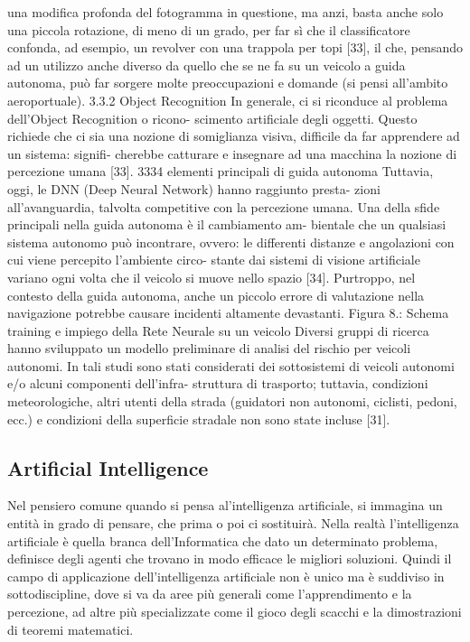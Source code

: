 \documentclass[14pt]{extarticle}
\begin{document}
\begin{itemize}
una modifica profonda del fotogramma in questione, ma anzi, basta
anche solo una piccola rotazione, di meno di un grado, per far sì che il
classificatore confonda, ad esempio, un revolver con una trappola per topi
[33], il che, pensando ad un utilizzo anche diverso da quello che se ne fa
su un veicolo a guida autonoma, può far sorgere molte preoccupazioni e
domande (si pensi all’ambito aeroportuale).
3.3.2
Object Recognition
In generale, ci si riconduce al problema dell’Object Recognition o ricono-
scimento artificiale degli oggetti. Questo richiede che ci sia una nozione
di somiglianza visiva, difficile da far apprendere ad un sistema: signifi-
cherebbe catturare e insegnare ad una macchina la nozione di percezione
umana [33].
3334
elementi principali di guida autonoma
Tuttavia, oggi, le DNN (Deep Neural Network) hanno raggiunto presta-
zioni all’avanguardia, talvolta competitive con la percezione umana.
Una della sfide principali nella guida autonoma è il cambiamento am-
bientale che un qualsiasi sistema autonomo può incontrare, ovvero: le
differenti distanze e angolazioni con cui viene percepito l’ambiente circo-
stante dai sistemi di visione artificiale variano ogni volta che il veicolo si
muove nello spazio [34].
Purtroppo, nel contesto della guida autonoma, anche un piccolo errore
di valutazione nella navigazione potrebbe causare incidenti altamente
devastanti.
Figura 8.: Schema training e impiego della Rete Neurale su un veicolo
Diversi gruppi di ricerca hanno sviluppato un modello preliminare di
analisi del rischio per veicoli autonomi. In tali studi sono stati considerati
dei sottosistemi di veicoli autonomi e/o alcuni componenti dell’infra-
struttura di trasporto; tuttavia, condizioni meteorologiche, altri utenti
della strada (guidatori non autonomi, ciclisti, pedoni, ecc.) e condizioni
della superficie stradale non sono state incluse [31].

\subsection{Artificial Intelligence}
Nel pensiero comune quando si pensa al'intelligenza artificiale, si immagina un entità in grado di pensare, che prima o poi ci sostituirà. Nella realtà l'intelligenza artificiale è quella branca dell'Informatica che dato un determinato problema, definisce degli agenti che trovano in modo efficace le migliori soluzioni. Quindi il campo di  applicazione dell'intelligenza artificiale non è unico ma è suddiviso in sottodiscipline, dove si va da aree più generali come l'apprendimento e la percezione, ad altre più specializzate come il gioco degli scacchi e la dimostrazioni di teoremi matematici.

\end{itemize}
\end{document}

